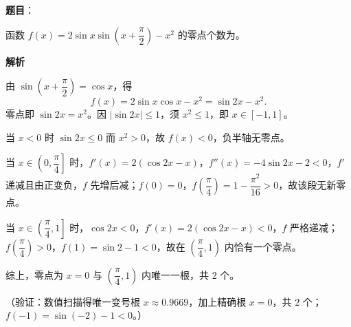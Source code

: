 \begin{answer}

\textbf{题目}：

函数 \(f(x)=2\sin x\sin\left(x+\dfrac{\pi}{2}\right)-x^2\) 的零点个数为\gkblank{}。

\textbf{解析}

由 \(\sin\left(x+\dfrac{\pi}{2}\right)=\cos x\)，得
\nopagebreak[4]
\[
f(x)=2\sin x\cos x-x^2=\sin2x-x^2.
\]
零点即 \(\sin2x=x^2\)。因 \(|\sin2x|\leqslant1\)，须 \(x^2\leqslant1\)，即 \(x\in[-1,1]\)。

当 \(x<0\) 时 \(\sin2x\leqslant0\) 而 \(x^2>0\)，故 \(f(x)<0\)，负半轴无零点。

当 \(x\in\left(0,\dfrac{\pi}{4}\right]\) 时，\(f'(x)=2(\cos2x-x)\)，\(f''(x)=-4\sin2x-2<0\)，\(f'\) 递减且由正变负，\(f\) 先增后减；\(f(0)=0\)，\(f\left(\dfrac{\pi}{4}\right)=1-\dfrac{\pi^2}{16}>0\)，故该段无新零点。

当 \(x\in\left(\dfrac{\pi}{4},1\right]\) 时，\(\cos2x<0\)，\(f'(x)=2(\cos2x-x)<0\)，\(f\) 严格递减；\(f\left(\dfrac{\pi}{4}\right)>0\)，\(f(1)=\sin2-1<0\)，故在 \(\left(\dfrac{\pi}{4},1\right)\) 内恰有一个零点。

综上，零点为 \(x=0\) 与 \(\left(\dfrac{\pi}{4},1\right)\) 内唯一一根，共 \(2\) 个。

（验证：数值扫描得唯一变号根 \(x\approx0.9669\)，加上精确根 \(x=0\)，共 \(2\) 个；\(f(-1)=\sin(-2)-1<0\)。）


\end{answer}

